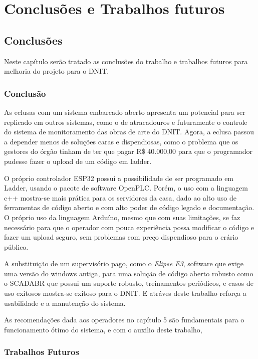 \part{Conclusões e Trabalhos futuros}

\chapter[Conclusões]{Conclusões}
Neste capítulo serão tratado as conclusões do trabalho e trabalhos futuros para melhoria do projeto para o DNIT.
\section{Conclusão}

As eclusas com um sistema embarcado aberto apresenta um potencial para ser replicado em outros sistemas, como o de atracadouros e futuramente o controle do sistema de monitoramento das obras de arte do DNIT. Agora, a eclusa passou a depender menos de soluções caras e dispendiosas, como o problema que os gestores do órgão tinham de ter que pagar R\$ 40.000,00 para que o programador pudesse fazer o upload de um código em ladder.

O próprio controlador ESP32 possui a possibilidade de ser programado em Ladder, usando o pacote de software OpenPLC. Porém, o uso com a linguagem c++ mostra-se mais prática para os servidores da casa, dado ao alto uso de ferramentas de código aberto e com alto poder de código legado e documentação. O próprio uso da linguagem Arduíno, mesmo que com suas limitações, se faz necessário para que o operador com pouca experiência possa modificar o código e fazer um upload seguro, sem problemas com preço dispendioso para o erário público. 

A substituição de um supervisório pago, como o \textit{Elipse E3}, software que exige uma versão do windows antiga, para uma solução de código aberto robusto como o SCADABR que possui um suporte robusto, treinamentos periódicos, e casos de uso exitosos mostra-se exitoso para o DNIT. E atráves deste trabalho reforça a usabilidade e a manutenção do sistema. 

As recomendações dada aos operadores no capítulo 5 são fundamentais para o funcionamento ótimo do sistema, e com o auxilio deste trabalho, 

\section{Trabalhos Futuros}

